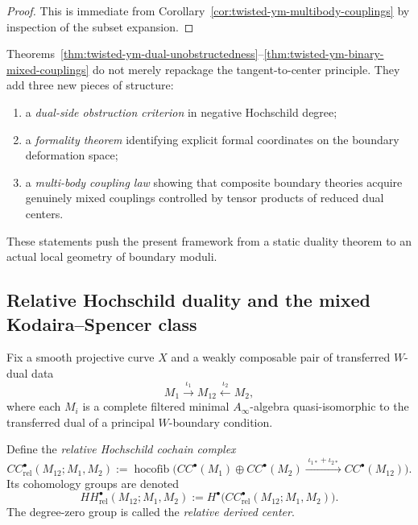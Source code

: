 \begin{proof}
This is immediate from Corollary~\ref{cor:twisted-ym-multibody-couplings} by inspection of the subset expansion.
\end{proof}

\begin{remark}
Theorems~\ref{thm:twisted-ym-dual-unobstructedness}--\ref{thm:twisted-ym-binary-mixed-couplings} do not merely repackage the tangent-to-center principle. They add three new pieces of structure:
\begin{enumerate}[label=(\roman*)]
\item a \emph{dual-side obstruction criterion} in negative Hochschild degree;
\item a \emph{formality theorem} identifying explicit formal coordinates on the boundary deformation space;
\item a \emph{multi-body coupling law} showing that composite boundary theories acquire genuinely mixed couplings controlled by tensor products of reduced dual centers.
\end{enumerate}
These statements push the present framework from a static duality theorem to an actual local geometry of boundary moduli.
\end{remark}




\subsection{Relative Hochschild duality and the mixed Kodaira--Spencer class}

Fix a smooth projective curve $X$ and a weakly composable pair of transferred $W$-dual data
\[
M_1 \xrightarrow{\iota_1} M_{12} \xleftarrow{\iota_2} M_2,
\]
where each $M_i$ is a complete filtered minimal $A_\infty$-algebra quasi-isomorphic to the transferred dual of a principal $W$-boundary condition.

\begin{definition}
Define the \emph{relative Hochschild cochain complex}
\[
CC^\bullet_{\mathrm{rel}}(M_{12};M_1,M_2)
:=
\operatorname{hocofib}\!\Big(
CC^\bullet(M_1)\oplus CC^\bullet(M_2)
\xrightarrow{\;\iota_{1*}+\iota_{2*}\;}
CC^\bullet(M_{12})
\Big).
\]
Its cohomology groups are denoted
\[
HH^\bullet_{\mathrm{rel}}(M_{12};M_1,M_2)
:= H^\bullet\big(CC^\bullet_{\mathrm{rel}}(M_{12};M_1,M_2)\big).
\]
The degree-zero group is called the \emph{relative derived center}.
\end{definition}

